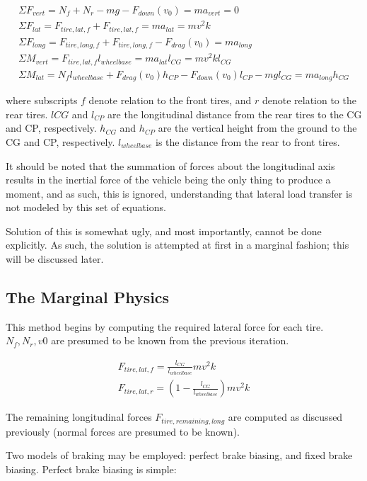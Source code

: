 \documentclass{article}
\begin{document}
\begin{align}
	\Sigma F_{vert} = N_{f} + N_{r} - m g - F_{down}(v_0) = m a_{vert} = 0 \\
	\Sigma F_{lat}  = F_{tire,lat,f} + F_{tire,lat,f} = m a_{lat} = m v^2 k \\
	\Sigma F_{long} = F_{tire,long,f} + F_{tire,long,f} - F_{drag}(v_0) = m a_{long} \\	
	\Sigma M_{vert} = F_{tire,lat,f} l_{wheelbase} = m a_{lat} l_{CG} = m v^2 k l_{CG}\\
	\Sigma M_{lat}  = N_{f} l_{wheelbase} + F_{drag}(v_0) h_{CP} - F_{down}(v_0) l_{CP} - m g l_{CG} = m a_{long} h_{CG}
\end{align}

where subscripts $f$ denote relation to the front tires, and $r$ denote relation to the rear tires. $l{CG}$ and $l_{CP}$ are the longitudinal distance from the rear tires to the CG and CP, respectively. $h_{CG}$ and $h_{CP}$ are the vertical height from the ground to the CG and CP, respectively. $l_{wheelbase}$ is the distance from the rear to front tires.

It should be noted that the summation of forces about the longitudinal axis results in the inertial force of the vehicle being the only thing to produce a moment, and as such, this is ignored, understanding that lateral load transfer is not modeled by this set of equations.

Solution of this is somewhat ugly, and most importantly, cannot be done explicitly. As such, the solution is attempted at first in a marginal fashion; this will be discussed later.

\subsection{The Marginal Physics}
This method begins by computing the required lateral force for each tire. $N_f, N_r, v0$ are presumed to be known from the previous iteration.

\begin{align}
	F_{tire,lat,f} = \frac{l_{CG}}{l_{wheelbase}} m v^2 k \\ 
	F_{tire,lat,r} = (1-\frac{l_{CG}}{l_{wheelbase}}) m v^2 k
\end{align}

The remaining longitudinal forces $F_{tire,remaining,long}$ are computed as discussed previously (normal forces are presumed to be known). 

Two models of braking may be employed: perfect brake biasing, and fixed brake biasing. Perfect brake biasing is simple:
\end{document}
